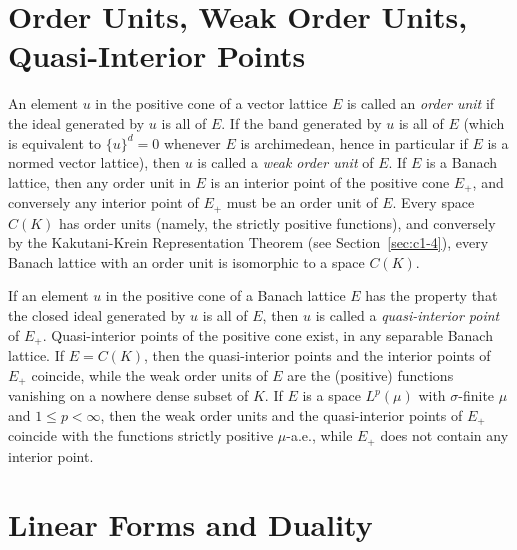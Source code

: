 \section{Order Units, Weak Order Units, Quasi-Interior Points}\label{sec:c1-2}

An element $ u $ in the positive cone of a vector lattice $ E $ is called an \emph{order unit} if the ideal generated by $ u $ is all of $ E $.
If the band generated by $ u $ is all of $ E $ (which is equivalent to $ \{u\}^{d} = 0 $ whenever $ E $ is archimedean, hence in particular if $ E $ is a normed vector lattice), then $ u $ is called a \emph{weak order unit} of $ E $.
If $ E $ is a Banach lattice, then any order unit in $ E $ is an interior point of the positive cone $ E_{+} $, and conversely any interior point of $ E_{+} $ must be an order unit of $ E $.
Every space $ C(K) $ has order units (namely, the strictly positive functions), and conversely by the Kakutani-Krein Representation Theorem (see Section~\ref{sec:c1-4}), every Banach lattice with an order unit is isomorphic to a space $ C(K) $.

If an element $ u $ in the positive cone of a Banach lattice $ E $ has the property that the closed ideal generated by $ u $ is all of $ E $, then $ u $ is called a \emph{quasi-interior point} of $ E_{+} $.
Quasi-interior points of the positive cone exist, \eg in any separable Banach lattice.
If $ E = C(K) $, then the quasi-interior points and the interior points of $ E_{+} $ coincide, while the weak order units of $ E $ are the (positive) functions vanishing on a nowhere dense subset of $ K $.
If $ E $ is a space $ L^{p}(\mu) $ with $ \sigma $-finite $ \mu $ and $ 1 \leq p < \infty $, then the weak order units and the quasi-interior points of $ E_{+} $ coincide with the functions strictly positive $ \mu $-a.e., while $ E_{+} $ does not contain any interior point.
\section{Linear Forms and Duality}\label{sec:c1-3}

